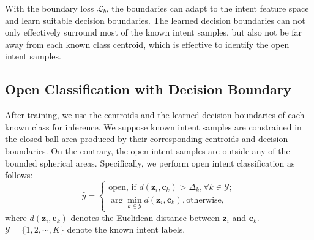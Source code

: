 \documentclass[letterpaper]{article} %
\begin{document}
With the boundary loss $\mathcal{L}_{b}$, the boundaries can adapt to the intent feature space and learn suitable decision boundaries. The learned decision boundaries can not only effectively surround most of the known intent samples, but also not be far away from each known class centroid, which is effective to identify the open intent samples.
\subsection{Open Classification with Decision Boundary}
After training, we use the centroids and the learned decision boundaries of each known class for inference. We suppose known intent samples are constrained in the closed ball area produced by their corresponding centroids and decision boundaries. On the contrary, the  open intent samples are outside any of the bounded spherical areas. Specifically, we perform open intent classification as follows:
\begin{equation}
\hat{y}=\left\{\begin{array}{l}
\text {open, if } d(\boldsymbol{z}_{i},\boldsymbol{c}_{k}) > \Delta_{k}, \forall k \in \mathcal{Y}; \\
\arg \min _{k \in \mathcal{Y}} d(\boldsymbol{z}_{i},\boldsymbol{c}_{k}), \text {otherwise},
\end{array}\right.
\end{equation}
where $d(\boldsymbol{z}_{i},\boldsymbol{c}_{k})$ denotes the Euclidean distance between $\boldsymbol{z}_{i}$ and $\boldsymbol{c}_{k}$. $\mathcal{Y}=\{1,2,\cdots,K\}$ denote the known intent labels.
\end{document}
